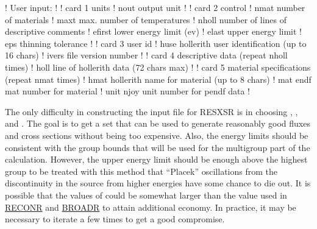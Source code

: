 \small
\begin{ccode}

   !  User input:
   !
   !   card 1   units
   !      nout     output unit
   !
   !   card 2   control
   !      nmat     number of materials
   !      maxt     max. number of temperatures
   !      nholl    number of lines of descriptive comments
   !      efirst   lower energy limit (ev)
   !      elast    upper energy limit
   !      eps      thinning tolerance
   !
   !   card 3   user id
   !      huse     hollerith user identification (up to 16 chars)
   !      ivers    file version number
   !
   !   card 4   descriptive data (repeat nholl times)
   !      holl     line of hollerith data (72 chars max)
   !
   !   card 5   material specifications (repeat nmat times)
   !      hmat     hollerith name for material (up to 8 chars)
   !      mat      endf mat number for material
   !      unit     njoy unit number for pendf data
   !

\end{ccode}
\normalsize

The only difficulty in constructing the input file for RESXSR is in
choosing , , and .  The goal is to
get a set that can be used to generate reasonably good fluxes and
cross sections without being too expensive.  Also, the energy limits
should be consistent with the group bounds that will be used for the
multigroup part of the calculation.  However, the upper energy
limit should be enough above the highest group to be treated with
this method that ``Placek'' oscillations from the discontinuity
in the source from higher energies have some chance to die out.
It is possible that the values of  could be somewhat
larger than the value used in \hyperlink{sRECONRhy}{RECONR}
and \hyperlink{sBROADRhy}{BROADR} to attain additional
economy.  In practice, it may be necessary to iterate a few times
to get a good compromise.

\cleardoublepage

